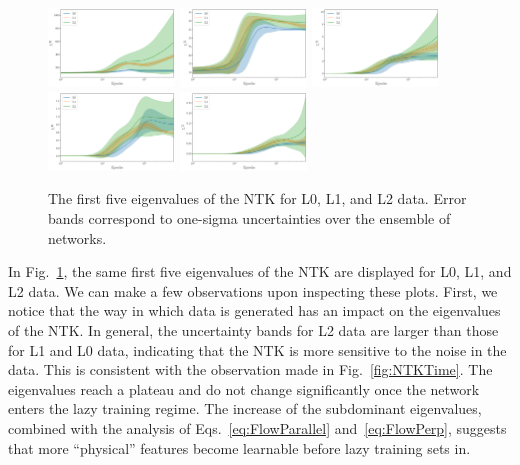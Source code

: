 \begin{figure}[t]
  \centering
  \includegraphics[width=0.30\textwidth]{figs/section_3/ntk_eigvals_L0_L1_L2_n_1.pdf}
  \includegraphics[width=0.30\textwidth]{figs/section_3/ntk_eigvals_L0_L1_L2_n_2.pdf}
  \includegraphics[width=0.30\textwidth]{figs/section_3/ntk_eigvals_L0_L1_L2_n_3.pdf}
  \includegraphics[width=0.30\textwidth]{figs/section_3/ntk_eigvals_L0_L1_L2_n_4.pdf}
  \includegraphics[width=0.30\textwidth]{figs/section_3/ntk_eigvals_L0_L1_L2_n_5.pdf}
  \caption{The first five eigenvalues of the NTK for L0, L1, and L2 data. Error
  bands correspond to one-sigma uncertainties over the ensemble of networks.}
  \label{fig:EigvalsComparison}
\end{figure}

In Fig.~\ref{fig:EigvalsComparison}, the same first five eigenvalues of the NTK
are displayed for L0, L1, and L2 data. We can make a few observations upon
inspecting these plots. First, we notice that the way in which data is generated
has an impact on the eigenvalues of the NTK. In general, the uncertainty bands
for L2 data are larger than those for L1 and L0 data, indicating that the NTK is
more sensitive to the noise in the data. This is consistent with the observation
made in Fig.~\ref{fig:NTKTime}. The eigenvalues reach a plateau and do not
change significantly once the network enters the lazy training regime. The
increase of the subdominant eigenvalues, combined with the analysis of
Eqs.~\eqref{eq:FlowParallel} and~\eqref{eq:FlowPerp}, suggests that more
``physical'' features become learnable before lazy training sets in.

